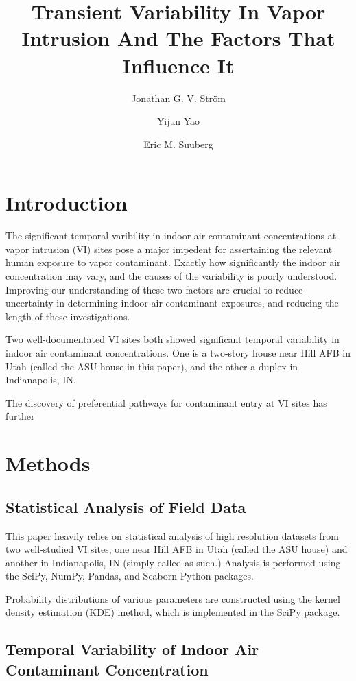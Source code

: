 \documentclass[journal=esthag,manuscript=article]{achemso}
\author{Jonathan G. V. Ström}
\affiliation[Brown University]{Brown University, School of Engineering, Providence, RI, USA}
\author{Yijun Yao}
\affiliation[Zhejiang University]{Zhejiang University, Hangzhou, China}
\author{Eric M. Suuberg}
\affiliation[Brown University]{Brown University, School of Engineering, Providence, RI, USA}
\title{Transient Variability In Vapor Intrusion And The Factors That Influence It}
\begin{document}
\begin{abstract}

\end{abstract}

\section{Introduction}

The significant temporal varibility in indoor air contaminant concentrations at vapor intrusion (VI) sites pose a major impedent for assertaining the relevant human exposure to vapor contaminant.
Exactly how significantly the indoor air concentration may vary, and the causes of the variability is poorly understood.
Improving our understanding of these two factors are crucial to reduce uncertainty in determining indoor air contaminant exposures, and reducing the length of these investigations.


Two well-documentated VI sites both showed significant temporal variability in indoor air contaminant concentrations.
One is a two-story house near Hill AFB in Utah (called the ASU house in this paper), and the other a duplex in Indianapolis, IN.

The discovery of preferential pathways for contaminant entry at VI sites has further

\section{Methods}

\subsection{Statistical Analysis of Field Data}

This paper heavily relies on statistical analysis of high resolution datasets from two well-studied VI sites, one near Hill AFB in Utah (called the ASU house) and another in Indianapolis, IN (simply called as such.)
Analysis is performed using the SciPy, NumPy, Pandas, and Seaborn Python packages.

Probability distributions of various parameters are constructed using the kernel density estimation (KDE) method\cite{altman_introduction_1992}, which is implemented in the SciPy package.

\subsection{Temporal Variability of Indoor Air Contaminant Concentration}
\end{document}
